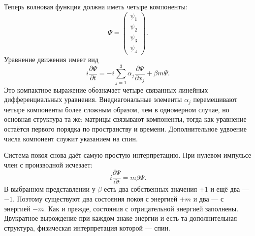 Теперь волновая функция должна иметь четыре компоненты:
\begin{equation}
\Psi=
\begin{pmatrix}
\psi_1\\
\psi_2\\
\psi_3\\
\psi_4
\end{pmatrix}.
\end{equation}
Уравнение движения имеет вид
\begin{equation}
i\frac{\partial\Psi}{\partial t}
=
-i\sum_{j=1}^{3}\alpha_j
\frac{\partial\Psi}{\partial x_j}
+\beta m\Psi.
\end{equation}
Это компактное выражение обозначает четыре связанных линейных дифференциальных уравнения. Внедиагональные элементы \(\alpha_j\) перемешивают четыре компоненты более сложным образом, чем в одномерном случае, но основная структура та же: матрицы связывают компоненты, тогда как уравнение остаётся первого порядка по пространству и времени. Дополнительное удвоение числа компонент служит указанием на спин.

\begin{classroomqa}
\end{classroomqa}

Система покоя снова даёт самую простую интерпретацию. При нулевом импульсе член с производной исчезает:
\begin{equation}
i\frac{\partial\Psi}{\partial t}=m\beta\Psi.
\end{equation}
В выбранном представлении у \(\beta\) есть два собственных значения \(+1\) и ещё два — \(-1\). Поэтому существуют два состояния покоя с энергией \(+m\) и два — с энергией \(-m\). Как и прежде, состояния с отрицательной энергией заполнены. Двукратное вырождение при каждом знаке энергии и есть та дополнительная структура, физическая интерпретация которой — спин.

\begin{classroomqa}
\end{classroomqa}

